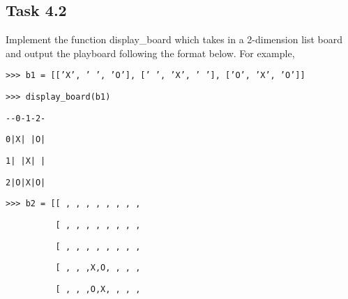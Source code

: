 \subsection*{Task 4.2}

Implement the function display\_board which takes in a 2-dimension
list board and output the playboard following the format below. For
example, 

\noindent %
\noindent\begin{minipage}[t]{1\columnwidth}%
\texttt{>\textcompwordmark >\textcompwordmark > b1 = {[}{[}'X',
' ', 'O'{]}, {[}' ', 'X', ' '{]}, {[}'O', 'X', 'O'{]}{]}}

\texttt{>\textcompwordmark >\textcompwordmark > display\_board(b1) }

\texttt{-{}-0-1-2- }

\texttt{0|X| |O| }

\texttt{1| |X| | }

\texttt{2|O|X|O| }

\texttt{>\textcompwordmark >\textcompwordmark > b2 = {[}{[}\textquotedbl{}
\textquotedbl ,\textquotedbl{} \textquotedbl ,\textquotedbl{} \textquotedbl ,\textquotedbl{}
\textquotedbl ,\textquotedbl{} \textquotedbl ,\textquotedbl{} \textquotedbl ,\textquotedbl{}
\textquotedbl ,\textquotedbl{} \textquotedbl{]}, }

\texttt{~~~~~~~~~~{[}\textquotedbl{} \textquotedbl ,\textquotedbl{}
\textquotedbl ,\textquotedbl{} \textquotedbl ,\textquotedbl{} \textquotedbl ,\textquotedbl{}
\textquotedbl ,\textquotedbl{} \textquotedbl ,\textquotedbl{} \textquotedbl ,\textquotedbl{}
\textquotedbl{]}, }

\texttt{~~~~~~~~~~{[}\textquotedbl{} \textquotedbl ,\textquotedbl{}
\textquotedbl ,\textquotedbl{} \textquotedbl ,\textquotedbl{} \textquotedbl ,\textquotedbl{}
\textquotedbl ,\textquotedbl{} \textquotedbl ,\textquotedbl{} \textquotedbl ,\textquotedbl{}
\textquotedbl{]}, }

\texttt{~~~~~~~~~~{[}\textquotedbl{} \textquotedbl ,\textquotedbl{}
\textquotedbl ,\textquotedbl{} \textquotedbl ,\textquotedbl X\textquotedbl ,\textquotedbl O\textquotedbl ,\textquotedbl{}
\textquotedbl ,\textquotedbl{} \textquotedbl ,\textquotedbl{} \textquotedbl{]}, }

\texttt{~~~~~~~~~~{[}\textquotedbl{} \textquotedbl ,\textquotedbl{}
\textquotedbl ,\textquotedbl{} \textquotedbl ,\textquotedbl O\textquotedbl ,\textquotedbl X\textquotedbl ,\textquotedbl{}
\textquotedbl ,\textquotedbl{} \textquotedbl ,\textquotedbl{} \textquotedbl{]}, }


\end{minipage}
